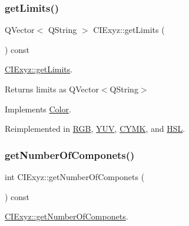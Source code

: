 \mbox{\label{class_c_i_exyz_a4c3aa6777f7720ae26b53174322a83f8}} 
\subsubsection{\texorpdfstring{get\+Limits()}{getLimits()}}
{\footnotesize\ttfamily Q\+Vector$<$ Q\+String $>$ C\+I\+Exyz\+::get\+Limits (\begin{DoxyParamCaption}{ }\end{DoxyParamCaption}) const\hspace{0.3cm}{\ttfamily [virtual]}}



\hyperlink{class_c_i_exyz_a4c3aa6777f7720ae26b53174322a83f8}{C\+I\+Exyz\+::get\+Limits}. 

\begin{DoxyReturn}{Returns}
limits as Q\+Vector$<$\+Q\+String$>$ 
\end{DoxyReturn}


Implements \hyperlink{class_color}{Color}.



Reimplemented in \hyperlink{class_r_g_b_a4ae8d5c061e45f557a5924f2237c1d0e}{R\+GB}, \hyperlink{class_y_u_v_a344cd573b663c97f5554afcb1c15458c}{Y\+UV}, \hyperlink{class_c_y_m_k_a9e0f2df82394cab1f95782f381c560ab}{C\+Y\+MK}, and \hyperlink{class_h_s_l_a7ac26d7b7b5755769165455e1b6d3312}{H\+SL}.

\mbox{\label{class_c_i_exyz_af168733bb1bca36a7ae5d75c67de046e}} 
\subsubsection{\texorpdfstring{get\+Number\+Of\+Componets()}{getNumberOfComponets()}}
{\footnotesize\ttfamily int C\+I\+Exyz\+::get\+Number\+Of\+Componets (\begin{DoxyParamCaption}{ }\end{DoxyParamCaption}) const\hspace{0.3cm}{\ttfamily [virtual]}}



\hyperlink{class_c_i_exyz_af168733bb1bca36a7ae5d75c67de046e}{C\+I\+Exyz\+::get\+Number\+Of\+Componets}. 

